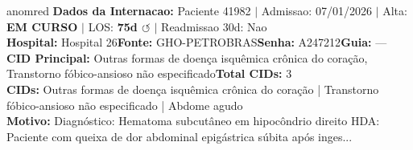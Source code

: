 \documentclass[a4paper,10pt]{article}
\begin{document}
\begin{anomalycard}[Internacao 161010 | GHO-PETROBRAS | CRITICO (z=5.68)]{anomred}
\textbf{Dados da Internacao:} Paciente 41982 $\mid$ Admissao: 07/01/2026 $\mid$ Alta: \textcolor{anomorange}{\textbf{EM CURSO}} $\mid$ LOS: \textbf{75d \textcolor{anomorange}{$\circlearrowleft$}} $\mid$ Readmissao 30d: Nao\\
\textbf{Hospital:} Hospital 26\quad\textbf{Fonte:} GHO-PETROBRAS\quad\textbf{Senha:} A247212\quad\textbf{Guia:} ---\\
\textbf{CID Principal:} {\small Outras formas de doença isquêmica crônica do coração, Transtorno fóbico-ansioso não especificado}\quad\textbf{Total CIDs:} 3\\

\textbf{CIDs:} {\scriptsize Outras formas de doença isquêmica crônica do coração | Transtorno fóbico-ansioso não especificado | Abdome agudo}\\

\textbf{Motivo:} {\scriptsize Diagnóstico: Hematoma subcutâneo em hipocôndrio direito  HDA: Paciente com queixa de dor abdominal epigástrica súbita após inges...}\\


\end{anomalycard}
\end{document}
